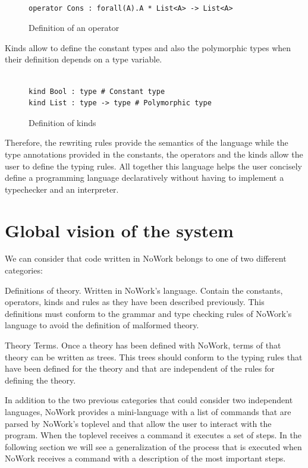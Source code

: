 \documentclass[12pt,a4paper]{article}
\begin{document}
\begin{figure}[!h]
\begin{verbatim}

operator Cons : forall(A).A * List<A> -> List<A>

\end{verbatim}
\caption{Definition of an operator}
\end{figure}

Kinds allow to define the constant types and also the polymorphic types when
their definition depends on a type variable.

\begin{figure}[!h]
\begin{verbatim}

kind Bool : type # Constant type
kind List : type -> type # Polymorphic type
\end{verbatim}
\caption{Definition of kinds}
\end{figure}

Therefore, the rewriting rules provide the semantics of the language
while the type annotations provided in the constants, the operators and
the kinds allow the user to define the typing rules. All together
this language helps the user concisely define a programming language
declaratively without having to implement a typechecker and
an interpreter.

\section{Global vision of the system}

We can consider that code written in NoWork belongs to one of two
different categories:

Definitions of theory. Written in NoWork's language. Contain the
constants, operators, kinds and rules as they have been described
previously. This definitions must conform to the grammar and type
checking rules of NoWork's language to avoid the definition of
malformed theory.

Theory Terms. Once a theory has been defined with NoWork, terms of
that theory can be written as trees. This trees should conform to the
typing rules that have been defined for the theory and that are
independent of the rules for defining the theory.

In addition to the two previous categories that could consider two independent 
languages, NoWork provides a mini-language with a list of commands that are parsed by
NoWork's toplevel and that allow the user to interact with the
program. When the toplevel receives a command it executes a set of
steps. In the following section we will see a generalization of the process that is
executed when NoWork receives a command with a description of the most important steps.
\end{document}
